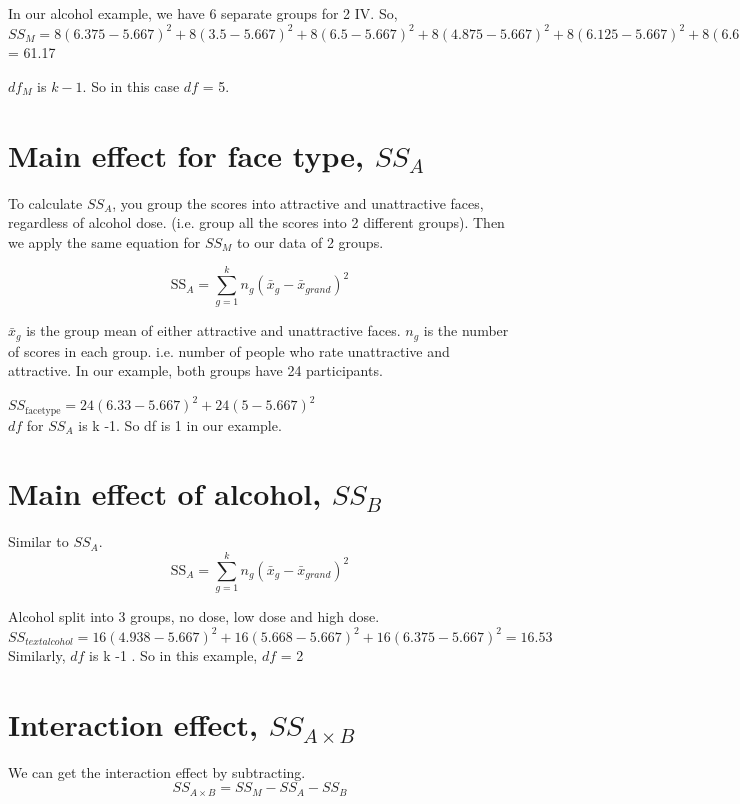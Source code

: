 \documentclass[a4paper, 12pt]{book}
\begin{document}
In our alcohol example, we have 6 separate groups for 2 IV. So, \\

 $SS_M = 8(6.375-5.667)^2 + 8(3.5-5.667)^2 + 8(6.5-5.667)^2 + 8(4.875-5.667)^2 + 8(6.125-5.667)^2 + 8(6.625-5.667)^2$ = 61.17

$df_M$ is $k-1$. So in this case $df$ = 5.

\section{Main effect for face type, $SS_A$}
To calculate $SS_A$, you group the scores into attractive and unattractive faces, regardless of alcohol dose. (i.e. group all the scores into 2 different groups). Then we apply the same equation for $SS_M$ to our data of 2 groups.

\begin{equation}
\text{SS}_A = \sum^k_{g=1} n_g(\bar{x}_g - \bar{x}_{grand})^2
\end{equation}

$\bar{x}_g$ is the group mean of either attractive and unattractive faces. $n_g$ is the number of scores in each group. i.e. number of people who rate unattractive and attractive. In our example, both groups have 24 participants.

$SS_{\text{facetype}} = 24(6.33-5.667)^2 + 24(5-5.667)^2$ \\

$df$ for $SS_A$ is k -1. So df is 1 in our example. 

\section{Main effect of alcohol, $SS_B$}
Similar to $SS_A$.
\begin{equation}
\text{SS}_A = \sum^k_{g=1} n_g(\bar{x}_g - \bar{x}_{grand})^2
\end{equation}

Alcohol split into 3 groups, no dose, low dose and high dose. \\
$SS_{text{alcohol}} = 16(4.938-5.667)^2+ 16(5.668-5.667)^2 + 16(6.375-5.667)^2 = 16.53 $\\

Similarly, $df$ is k -1 . So in this example, $df$ = 2

\section{Interaction effect, $SS_{A \times B}$}
We can get the interaction effect by subtracting. 
\begin{equation}
SS_{A \times B} = SS_M - SS_A - SS_B
\end{equation}
\end{document}
